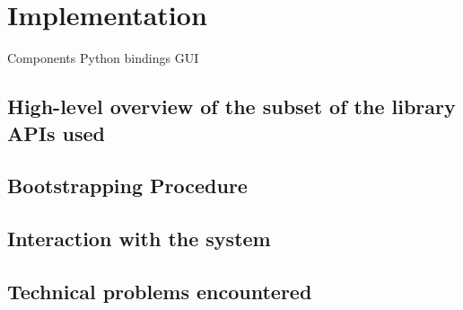 \chapter{Implementation}

Components
	Python bindings
	GUI
	

\section{High-level overview of the subset of the library APIs used}

\section{Bootstrapping Procedure}

\section{Interaction with the system}

\section{Technical problems encountered}